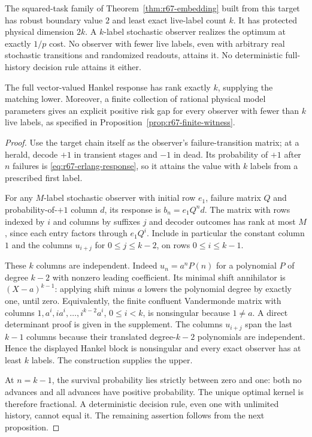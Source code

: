 \begin{theorem}\label{thm:r67-hierarchy}
The squared-task family of Theorem~\ref{thm:r67-embedding} built from this target has robust boundary value $2$ and least exact live-label count $k$. It has protected physical dimension $2k$. A $k$-label stochastic observer realizes the optimum at exactly $1/p$ cost. No observer with fewer live labels, even with arbitrary real stochastic transitions and randomized readouts, attains it. No deterministic full-history decision rule attains it either.

The full vector-valued Hankel response has rank exactly $k$, supplying the matching lower. Moreover, a finite collection of rational physical model parameters gives an explicit positive risk gap for every observer with fewer than $k$ live labels, as specified in Proposition~\ref{prop:r67-finite-witness}.
\end{theorem}
\begin{proof}
Use the target chain itself as the observer's failure-transition matrix; at a herald, decode $+1$ in transient stages and $-1$ in dead. Its probability of $+1$ after $n$ failures is \eqref{eq:r67-erlang-response}, so it attains the value with $k$ labels from a prescribed first label.

For any $M$-label stochastic observer with initial row $e_1$, failure matrix $Q$ and probability-of-$+1$ column $d$, its response is $b_n=e_1Q^nd$. The matrix with rows indexed by $i$ and columns by suffixes $j$ and decoder outcomes has rank at most $M$, since each entry factors through $e_1Q^i$. Include in particular the constant column $1$ and the columns $u_{i+j}$ for $0\le j\le k-2$, on rows $0\le i\le k-1$.

These $k$ columns are independent. Indeed $u_n=a^nP(n)$ for a polynomial $P$ of degree $k-2$ with nonzero leading coefficient. Its minimal shift annihilator is $(X-a)^{k-1}$: applying shift minus $a$ lowers the polynomial degree by exactly one, until zero. Equivalently, the finite confluent Vandermonde matrix with columns $1,a^i,ia^i,\ldots,i^{k-2}a^i$, $0\le i<k$, is nonsingular because $1\ne a$. A direct determinant proof is given in the supplement. The columns $u_{i+j}$ span the last $k-1$ columns because their translated degree-$k-2$ polynomials are independent. Hence the displayed Hankel block is nonsingular and every exact observer has at least $k$ labels. The construction supplies the upper.

At $n=k-1$, the survival probability lies strictly between zero and one: both no advances and all advances have positive probability. The unique optimal kernel is therefore fractional. A deterministic decision rule, even one with unlimited history, cannot equal it. The remaining assertion follows from the next proposition.
\end{proof}

